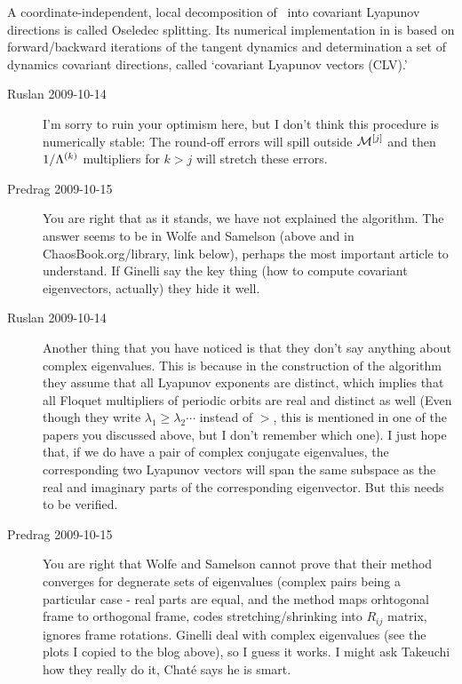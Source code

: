 A coordinate-independent, local decomposition of \statesp\
into covariant Lyapunov directions is called Oseledec
splitting.
Its numerical implementation in 
is based on forward/backward
iterations of the tangent dynamics and determination
a set of dynamics covariant directions,
called `covariant Lyapunov vectors (CLV).'

\begin{description}
  \item[Ruslan 2009-10-14] I'm sorry to ruin your
optimism here, but I don't think this procedure is
numerically stable: The round-off errors will spill outside
${\cal M}^{[j]}$ and then $1/\Lambda^{(k)}$ multipliers for $k >
j$ will stretch these errors.

\item[Predrag 2009-10-15]
You are right that as it stands, we have not explained the
algorithm. The answer seems to be in Wolfe and
Samelson (above and in ChaosBook.org/library, link
below), perhaps the most important article to understand.
If Ginelli \etal{} say the key thing (how
to compute covariant eigenvectors, actually) they hide it
well.

  \item[Ruslan 2009-10-14]
Another thing that you have noticed is that they don't say
anything about complex eigenvalues.  This is because in the
construction of the algorithm they assume that all Lyapunov
exponents are distinct, which implies that all Floquet
multipliers of periodic orbits are real and distinct as well
(Even though they write $\lambda_1 \geq \lambda_2 \cdots$
instead of $>$, this is mentioned in one of the papers you
discussed above, but I don't remember which one).  I just
hope that, if we do have a pair of complex conjugate
eigenvalues, the corresponding two Lyapunov vectors will span
the same subspace as the real and imaginary parts of the
corresponding eigenvector.  But this needs to be verified.

\item[Predrag 2009-10-15]
You are right that Wolfe and Samelson cannot prove
that their method converges for degnerate sets of eigenvalues
(complex pairs being a particular case - real parts are
equal, and the method maps orhtogonal frame to orthogonal
frame, codes stretching/shrinking into $R_{ij}$ matrix,
ignores frame rotations. Ginelli \etal{}
deal with complex eigenvalues (see the plots I copied to the
blog above), so I guess it works. I might ask Takeuchi how
they really do it, Chat\'e says he is smart.


\end{description}
